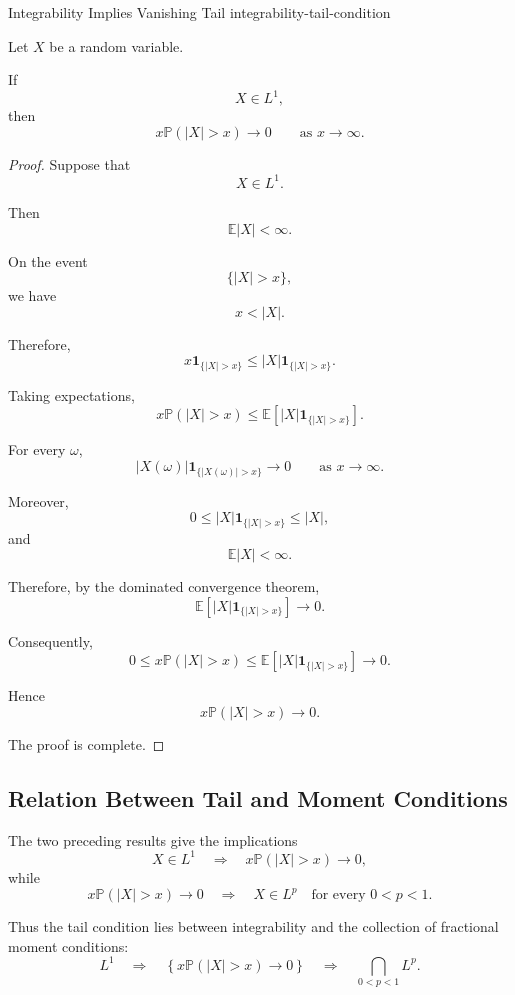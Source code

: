 \begin{theorem}{Integrability Implies Vanishing Tail}
{integrability-tail-condition}

Let $X$ be a random variable.

If
\[
X\in L^1,
\]
then
\[
\boxed{
x\mathbb{P}(|X|>x)
\longrightarrow0
\qquad
\text{as }x\to\infty.
}
\]

\end{theorem}


\begin{proof}

Suppose that
\[
X\in L^1.
\]

Then
\[
\mathbb{E}|X|<\infty.
\]

On the event
\[
\{|X|>x\},
\]
we have
\[
x<|X|.
\]

Therefore,
\[
x\mathbf{1}_{\{|X|>x\}}
\leq
|X|\mathbf{1}_{\{|X|>x\}}.
\]

Taking expectations,
\[
x\mathbb{P}(|X|>x)
\leq
\mathbb{E}
\left[
|X|\mathbf{1}_{\{|X|>x\}}
\right].
\]

For every $\omega$,
\[
|X(\omega)|
\mathbf{1}_{\{|X(\omega)|>x\}}
\longrightarrow0
\qquad
\text{as }x\to\infty.
\]

Moreover,
\[
0\leq
|X|\mathbf{1}_{\{|X|>x\}}
\leq
|X|,
\]
and
\[
\mathbb{E}|X|<\infty.
\]

Therefore, by the dominated convergence theorem,
\[
\mathbb{E}
\left[
|X|\mathbf{1}_{\{|X|>x\}}
\right]
\longrightarrow0.
\]

Consequently,
\[
0\leq
x\mathbb{P}(|X|>x)
\leq
\mathbb{E}
\left[
|X|\mathbf{1}_{\{|X|>x\}}
\right]
\longrightarrow0.
\]

Hence
\[
\boxed{
x\mathbb{P}(|X|>x)
\longrightarrow0.
}
\]

The proof is complete.

\end{proof}



\subsection{Relation Between Tail and Moment Conditions}

\begin{observation}

The two preceding results give the implications
\[
X\in L^1
\quad\Longrightarrow\quad
x\mathbb{P}(|X|>x)\longrightarrow0,
\]
while
\[
x\mathbb{P}(|X|>x)\longrightarrow0
\quad\Longrightarrow\quad
X\in L^p
\quad\text{for every }0<p<1.
\]

Thus the tail condition lies between integrability and the collection
of fractional moment conditions:
\[
L^1
\quad\Longrightarrow\quad
\left\{
x\mathbb{P}(|X|>x)\to0
\right\}
\quad\Longrightarrow\quad
\bigcap_{0<p<1}L^p.
\]

\end{observation}



\lectureend
